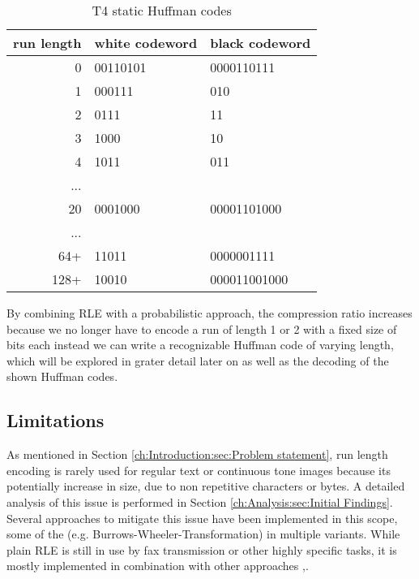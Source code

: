 \begin{table}
	\centering
	\begin{tabular}[p]{r|l|l}
		run length &  white codeword & black codeword\\
		\hline
		0 &  00110101 & 0000110111\\
		1 & 000111 & 010\\
		2 & 0111 & 11\\
		3 & 1000 & 10\\
		4 & 1011 & 011\\
		... &  & \\
		20 & 0001000 & 00001101000\\
		... & & \\
		64+ & 11011 & 0000001111\\
		128+ & 10010 & 000011001000
		\label{tab:t1:static huffman codes}
	\end{tabular}
	\caption{T4 static Huffman codes}
\end{table}
\par{
By combining RLE with a probabilistic approach, the compression ratio increases because we no longer have to encode a run of length 1 or 2 with a fixed size of bits each instead we can write a recognizable Huffman code of varying length, which will be explored in grater detail later on as well as the decoding of the shown Huffman codes.}

\subsection{Limitations}
\par{
As mentioned in Section \ref{ch:Introduction:sec:Problem statement}, run length encoding is rarely used for regular text or continuous tone images because its potentially increase in size, due to non repetitive characters or bytes. A detailed analysis of this issue is performed in Section \ref{ch:Analysis:sec:Initial Findings}. Several approaches to mitigate this issue have been implemented in this scope, some of the (e.g. Burrows-Wheeler-Transformation) in multiple variants. While plain RLE is still in use by fax transmission or other highly specific tasks, it is mostly implemented in combination with other approaches \cite{rle-dna},\cite{fax-rle}.
}
